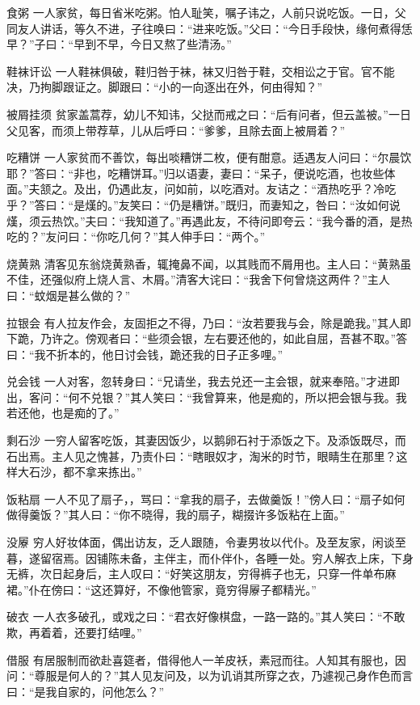 \documentclass[12pt,UTF8]{ctexbook}
\begin{document}
食粥
一人家贫，每日省米吃粥。怕人耻笑，嘱子讳之，人前只说吃饭。一日，父同友人讲话，等久不进，子往唤曰：“进来吃饭。”父曰：“今日手段快，缘何煮得恁早？”子曰：“早到不早，今日又熬了些清汤。”

鞋袜讦讼
一人鞋袜俱破，鞋归咎于袜，袜又归咎于鞋，交相讼之于官。官不能决，乃拘脚跟证之。脚跟曰：“小的一向逐出在外，何由得知？”

被屑挂须
贫家盖蒿荐，幼儿不知讳，父挞而戒之曰：“后有问者，但云盖被。”一日父见客，而须上带荐草，儿从后呼曰：“爹爹，且除去面上被屑着？”

吃糟饼
一人家贫而不善饮，每出啖糟饼二枚，便有酣意。适遇友人问曰：“尔晨饮耶？”答曰：“非也，吃糟饼耳。”归以语妻，妻曰：“呆子，便说吃酒，也妆些体面。”夫颔之。及出，仍遇此友，问如前，以吃酒对。友诘之：“酒热吃乎？冷吃乎？”答曰：“是熯的。”友笑曰：“仍是糟饼。”既归，而妻知之，咎曰：“汝如何说熯，须云热饮。”夫曰：“我知道了。”再遇此友，不待问即夸云：“我今番的酒，是热吃的？”友问曰：“你吃几何？”其人伸手曰：“两个。”

烧黄熟
清客见东翁烧黄熟香，辄掩鼻不闻，以其贱而不屑用也。主人曰：“黄熟虽不佳，还强似府上烧人言、木屑。”清客大诧曰：“我舍下何曾烧这两件？”主人曰：“蚊烟是甚么做的？”

拉银会
有人拉友作会，友固拒之不得，乃曰：“汝若要我与会，除是跪我。”其人即下跪，乃许之。傍观者曰：“些须会银，左右要还他的，如此自屈，吾甚不取。”答曰：“我不折本的，他日讨会钱，跪还我的日子正多哩。”

兑会钱
一人对客，忽转身曰：“兄请坐，我去兑还一主会银，就来奉陪。”才进即出，客问：“何不兑银？”其人笑曰：“我曾算来，他是痴的，所以把会银与我。我若还他，也是痴的了。”

剩石沙
一穷人留客吃饭，其妻因饭少，以鹅卵石衬于添饭之下。及添饭既尽，而石出焉。主人见之愧甚，乃责仆曰：“瞎眼奴才，淘米的时节，眼睛生在那里？这样大石沙，都不拿来拣出。”

饭粘扇
一人不见了扇子，，骂曰：“拿我的扇子，去做羹饭！”傍人曰：“扇子如何做得羹饭？”其人曰：“你不晓得，我的扇子，糊掇许多饭粘在上面。”

没屪
穷人好妆体面，偶出访友，乏人跟随，令妻男妆以代仆。及至友家，闲谈至暮，遂留宿焉。因铺陈未备，主伴主，而仆伴仆，各睡一处。穷人解衣上床，下身无裤，次日起身后，主人叹曰：“好笑这朋友，穷得裤子也无，只穿一件单布麻裙。”仆在傍曰：“这还算好，不像他管家，竟穷得屪子都精光。”

破衣
一人衣多破孔，或戏之曰：“君衣好像棋盘，一路一路的。”其人笑曰：“不敢欺，再着着，还要打结哩。”

借服
有居服制而欲赴喜筵者，借得他人一羊皮袄，素冠而往。人知其有服也，因问：“尊服是何人的？”其人见友问及，以为讥诮其所穿之衣，乃遽视己身作色而言曰：“是我自家的，问他怎么？”
\end{document}
